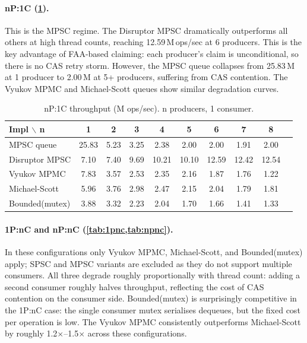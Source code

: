 \documentclass[11pt,a4paper]{article}
\begin{document}
\paragraph{nP:1C (\cref{tab:np1c}).}
This is the MPSC regime. The Disruptor MPSC dramatically outperforms all others
at high thread counts, reaching 12.59\,M\,ops/sec at 6 producers. This is the
key advantage of FAA-based claiming: each producer's claim is unconditional, so
there is no CAS retry storm. However, the MPSC queue collapses from 25.83\,M
at 1 producer to 2.00\,M at 5+ producers, suffering from CAS contention. The
Vyukov MPMC and Michael-Scott queues show similar degradation curves.

\begin{table}[H]
\centering
\caption{nP:1C throughput (M ops/sec). n producers, 1 consumer.}
\label{tab:np1c}
\begin{tabular}{@{}lccccccccc@{}}
\toprule
Impl $\backslash$ n & 1 & 2 & 3 & 4 & 5 & 6 & 7 & 8 \\
\midrule
MPSC queue      & 25.83 & 5.23 & 3.25 & 2.38 & 2.00 & 2.00 & 1.91 & 2.00 \\
Disruptor MPSC  & 7.10  & 7.40 & 9.69 &10.21 &10.10 &12.59 &12.42 &12.54 \\
Vyukov MPMC     & 7.83  & 3.57 & 2.53 & 2.35 & 2.16 & 1.87 & 1.76 & 1.22 \\
Michael-Scott   & 5.96  & 3.76 & 2.98 & 2.47 & 2.15 & 2.04 & 1.79 & 1.81 \\
Bounded(mutex)  & 3.88  & 3.32 & 2.23 & 2.04 & 1.70 & 1.66 & 1.41 & 1.33 \\
\bottomrule
\end{tabular}
\end{table}

\paragraph{1P:nC and nP:nC (\cref{tab:1pnc,tab:npnc}).}
In these configurations only Vyukov MPMC, Michael-Scott, and Bounded(mutex) apply;
SPSC and MPSC variants are excluded as they do not support multiple consumers. All
three degrade roughly proportionally with thread count: adding a second consumer
roughly halves throughput, reflecting the cost of CAS contention on the consumer
side. Bounded(mutex) is surprisingly competitive in the 1P:nC case: the single
consumer mutex serialises dequeues, but the fixed cost per operation is low. The
Vyukov MPMC consistently outperforms Michael-Scott by roughly 1.2$\times$--1.5$\times$
across these configurations.
\end{document}
